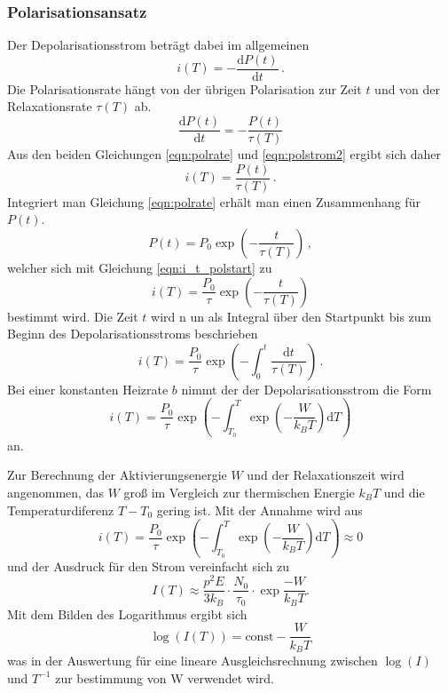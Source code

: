 \subsubsection{Polarisationsansatz}
Der Depolarisationsstrom beträgt dabei im allgemeinen
\begin{equation}
    i(T) = -\frac{\mathrm{d}P(t)}{\mathrm{d}t}\,.
    \label{eqn:polstrom2}
\end{equation}
Die Polarisationsrate hängt von der übrigen Polarisation zur Zeit $t$
und von der Relaxationsrate $\tau(T)$ ab.
\begin{equation}
    \frac{\text{d}{P(t)}}{\text{d}{t}} = -\frac{P(t)}{\tau(T)}
    \label{eqn:polrate}
\end{equation}
Aus den beiden Gleichungen \eqref{eqn:polrate} und \eqref{eqn:polstrom2} ergibt sich daher
\begin{equation}
    i(T) = \frac{P(t)}{\tau(T)}\,.
    \label{eqn:i_t_polstart}
\end{equation}
Integriert man Gleichung \eqref{eqn:polrate} erhält man einen Zusammenhang für $P(t)$.
\begin{equation}
    P(t) = P_{0} \exp\!\left(-\frac{t}{\tau(T)}\right)\,,
\end{equation}
welcher sich mit Gleichung \eqref{eqn:i_t_polstart} zu
\begin{equation}
    i(T) = \frac{P_0}{\tau} \exp\!\left(-\frac{t}{\tau(T)}\right) 
\end{equation}
bestimmt wird.
Die Zeit $t$ wird n un als Integral über den Startpunkt bis zum Beginn des Depolarisationsstroms beschrieben
\begin{equation}
    i(T) = \frac{P_{0}}{\tau} \exp\!\left(-\int_0^t \frac{\text{d}{t}}{\tau(T)}\right)\,.
\end{equation}
Bei einer konstanten Heizrate $b$ nimmt der der Depolarisationsstrom die Form
\begin{equation}
    i(T) = \frac{P_0}{\tau} \exp\!\left(-\int_{T_0}^T
      \exp\!\left(- \frac{W}{k_B T}\right) \text{d}{T}\right)
    \label{eq:final}
\end{equation}
an.

Zur Berechnung der Aktivierungsenergie $W$ und der Relaxationszeit wird angenommen,
das $W$ groß im Vergleich zur thermischen Energie $k_B T$
und die Temperaturdiferenz $T - T_0$ gering ist.
Mit der Annahme wird aus 
\begin{equation}
    i(T) = \frac{P_0}{\tau} \exp\!\left(-\int_{T_0}^T
      \exp\!\left(- \frac{W}{k_B T}\right) \text{d}{T}\right) \approx 0
\end{equation}
und der Ausdruck für den Strom vereinfacht sich zu 
\begin{equation}
    I(T) \approx \frac{p^2E}{3k_B}\cdot\frac{N_0}{\tau_0}\cdot\exp{\frac{-W}{k_B T}}.
\end{equation}
Mit dem Bilden des Logarithmus ergibt sich
\begin{equation}
    \log(I(T)) = \text{const} -\frac{W}{k_B T}
\end{equation}
was in der Auswertung für eine lineare Ausgleichsrechnung zwischen $\log(I)$
und $T^{-1}$ zur bestimmung von W verwendet wird.

